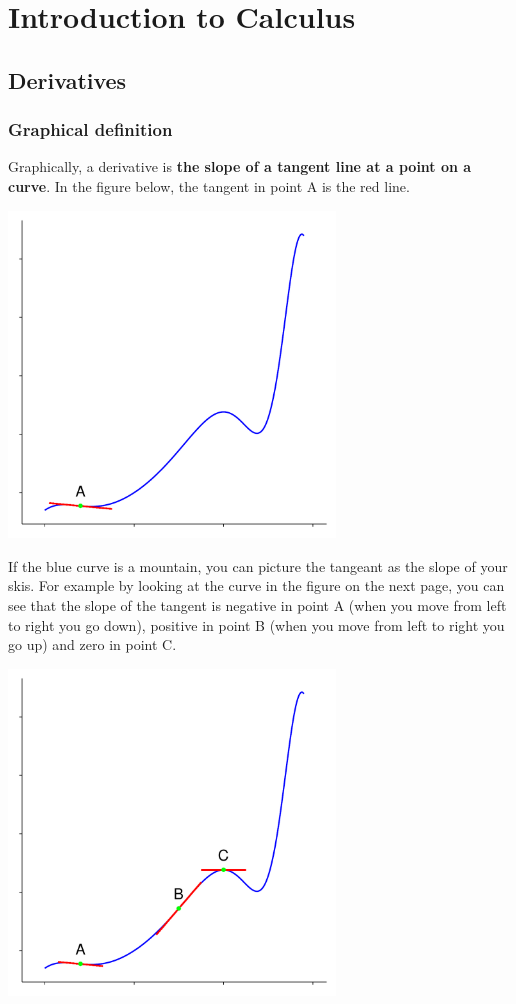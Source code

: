 \documentclass[a4paper]{report}
\begin{document}
\chapter{Introduction to Calculus}
\section{Derivatives}
\subsection{Graphical definition}
Graphically, a derivative is \textbf{the slope of a tangent line at a point on a curve}. In the figure below, the tangent in point A is the red line.\\
\begin{center}
\includegraphics[width=0.65\textwidth]{der_graph1.pdf}
\end{center}
If the blue curve is a mountain, you can picture the tangeant as the slope of your skis. For example by looking at the curve in the figure on the next page, you can see that the slope of the tangent is negative in point A (when you move from left to right you go down), positive in point B (when you move from left to right you go up) and zero in point C.\\
\begin{center}
\includegraphics[width=0.65\textwidth]{der_graph2.pdf}
\end{center}
\end{document}
